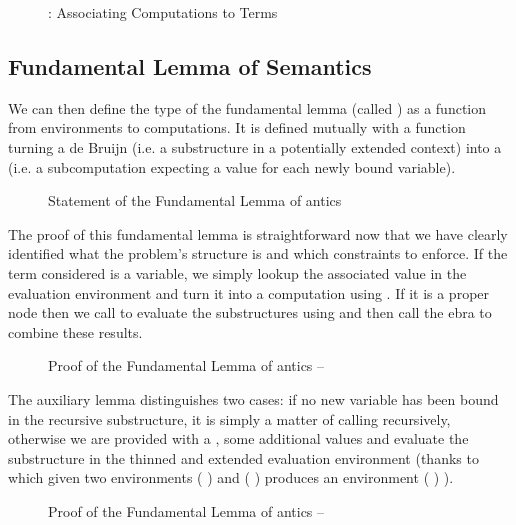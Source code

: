 \begin{figure}[h]
\caption{: Associating Computations to Terms}
\end{figure}

\subsection{Fundamental Lemma of Semantics}\label{def:body}

We can then define the type of the fundamental lemma (called ) as
a function from environments to computations. It is defined mutually with a
function  turning a de Bruijn  (i.e. a substructure in a
potentially extended context) into a  (i.e. a subcomputation
expecting a value for each newly bound variable).

\begin{figure}[h]
\caption{Statement of the Fundamental Lemma of antics}
\end{figure}

The proof  of this fundamental lemma is straightforward now
that we have clearly identified what the problem's structure is and
which constraints to enforce. If the term considered is a variable,
we simply lookup the associated value in the evaluation environment
and turn it into a computation using . If it is a proper
node then we call  to evaluate the substructures using
 and then call the ebra to combine these results.

\begin{figure}[h]
\caption{Proof of the Fundamental Lemma of antics -- }
\end{figure}

The auxiliary lemma  distinguishes two cases: if no new
variable has been bound in the recursive substructure, it is simply
a matter of calling  recursively, otherwise we are provided
with a , some additional values and evaluate the
substructure in the thinned and extended evaluation environment
(thanks to \AF{\_>>\_} which given two environments
{( )  } and {( )  }
produces an environment {( \AF{++}  )  )}.

\begin{figure}[h]
\caption{Proof of the Fundamental Lemma of antics -- }
\end{figure}

